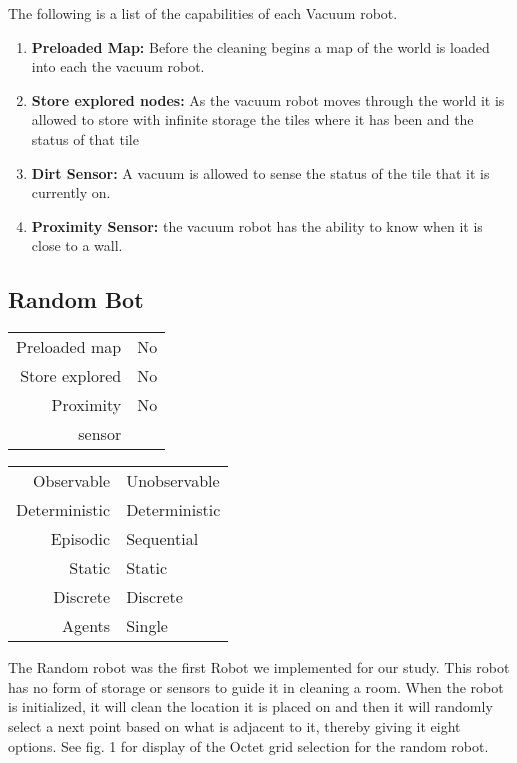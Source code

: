 \documentclass[letterpaper]{article}
\begin{document}
The following is a list of the capabilities of each Vacuum robot.
\begin{enumerate}  
\item \textbf{Preloaded Map:} Before the cleaning begins a map of the world is loaded into each the vacuum robot.
\item \textbf{Store explored nodes:} As the vacuum robot moves through the world it is allowed to store with infinite storage the tiles where it has been and the status of that tile
\item \textbf{Dirt Sensor:} A vacuum is allowed to sense the status of the tile that it is currently on.
\item \textbf{Proximity Sensor:} the vacuum robot has the ability to know when it is close to a wall.
\end{enumerate}  


\subsection{Random Bot}

\begin{tabular}{ r | l }  
	Preloaded map 		& No \\
	Store explored 		& No \\
	Proximity 		 	& No \\
	sensor 					 \\
\end{tabular}
\quad
\begin{tabular}{ r | l }  
	Observable		& Unobservable 	\\
	Deterministic	& Deterministic \\
	Episodic		& Sequential	\\
	Static		 	& Static 		\\
	Discrete 		& Discrete 		\\
	Agents		 	& Single 		\\
\end{tabular}
The Random robot was the first Robot we implemented for our study. This robot has no form of storage or sensors to guide it in cleaning a room. 
When the robot is initialized, it will clean the location it is placed on and then it will randomly select a next point based on what is adjacent to it, thereby giving it eight options. See fig. 1 for display of the Octet grid selection for the random robot. 
\end{document}
